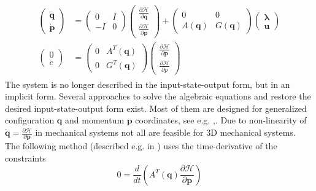 \documentclass[a4paper,twoside, openright,12pt]{report}
\newcommand{\f}[1]{\boldsymbol{#1}}
\begin{document}
{\begin{eqnarray}\label{EQ:PHSpconstrained}
\begin{aligned}
\begin{pmatrix}
\dot{\f{q}} \\ \dot{\f{p}} \end{pmatrix} &= 
\begin{pmatrix} 0 & I \\ -I & 0\end{pmatrix}
\begin{pmatrix}
\frac{\partial \mathcal{H}}{\partial \f{q}} \\ \frac{\partial \mathcal{H}}{\partial \f{p}}\end{pmatrix}
+ \begin{pmatrix}0 & 0 \\ A(\f{q}) & G(\f{q})\end{pmatrix}
\begin{pmatrix}\boldsymbol{\lambda} \\ \f{u}\end{pmatrix}
\\
\begin{pmatrix}0 \\ e\end{pmatrix} &=
\begin{pmatrix}0 & A^T(\f{q}) \\ 0 & G^T(\f{q})\end{pmatrix}
\begin{pmatrix}
\frac{\partial \mathcal{H}}{\partial \f{p}} \\ \frac{\partial \mathcal{H}}{\partial p}\end{pmatrix}
\end{aligned}
\end{eqnarray}
The system is no longer described in the input-state-output form, but in an implicit form. Several approaches to solve the algebraic equations and restore the desired input-state-output form exist. Most of them are designed for generalized configuration $\f{q}$ and momentum $\f{p}$ coordinates, see e.g. \cite{Schaft_13},\cite{Duindam_09}. Due to non-linearity of $\dot{\f{q}}=\frac{\partial \mathcal{H}}{\partial \f{p}}$ in mechanical systems not all are feasible for $3$D mechanical systems. \\
The following method (described e.g. in \cite{Duindam_09}) uses the time-derivative of the constraints
\begin{equation}\label{EQ:constraintderivative}
0 = \frac{d}{dt}\left(A^T(\f{q})\frac{\partial \mathcal{H}}{\partial \f{p}}\right)

\end{equation}}
\end{document}
